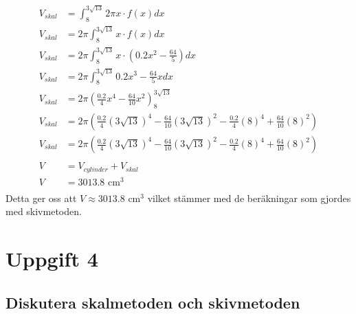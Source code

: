 \documentclass[12pt]{article}
\begin{document}
\begin{align*}
    V_{skal}&=\int_{8}^{3\sqrt{13}}2\pi x\cdot f(x) dx\\
    V_{skal}&=2\pi\int_{8}^{3\sqrt{13}}x\cdot f(x) dx\\
    V_{skal}&=2\pi\int_{8}^{3\sqrt{13}}x\cdot (0.2x^2-\frac{64}{5}) dx\\
    V_{skal}&=2\pi\int_{8}^{3\sqrt{13}}0.2x^3-\frac{64}{5}x dx\\
    V_{skal}&=2\pi{\left(\frac{0.2}{4}x^4-\frac{64}{10}x^2\right)}_{8}^{3\sqrt{13}}\\
    V_{skal}&=2\pi\left(\frac{0.2}{4}{(3\sqrt{13})}^4-\frac{64}{10}{(3\sqrt{13})}^2-\frac{0.2}{4}{(8)}^4+\frac{64}{10}{(8)}^2\right)\\
    V_{skal}&=2\pi\left(\frac{0.2}{4}{(3\sqrt{13})}^4-\frac{64}{10}{(3\sqrt{13})}^2-\frac{0.2}{4}{(8)}^4+\frac{64}{10}{(8)}^2\right)\\
    \\
    V&=V_{cylinder}+V_{skal}\\
    V&=3013.8 \text { cm}^3\\
\end{align*}
Detta ger oss att $V\approx 3013.8 \text { cm}^3$ vilket stämmer med de beräkningar som gjordes med skivmetoden.
\newpage
\section*{Uppgift 4}
\subsection*{Diskutera skalmetoden och skivmetoden}
\end{document}
